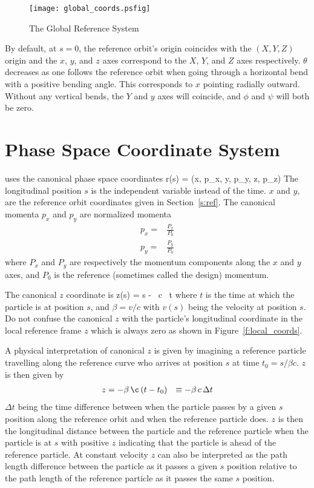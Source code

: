 \begin{figure}
\centering
\texttt{[image: global\_coords.psfig]}
\caption{The Global Reference System}
\label{f:global_coords}
\end{figure}

By default, at $s = 0$,
the reference orbit's origin coincides with the
$(X, Y, Z)$ origin and the $x$, $y$, and $z$ axes
correspond to the $X$, $Y$, and $Z$ axes respectively. $\theta$
decreases as one follows the reference orbit when going through a
horizontal bend with a positive bending angle. This corresponds to $x$
pointing radially outward. Without any vertical bends, the $Y$ and $y$
axes will coincide, and $\phi$ and $\psi$ will both be zero.

\vfill

\section{Phase Space Coordinate System}
\label{s:phase_space_coords}

\bmad uses the canonical phase space coordinates 
\Begineq
  \Bf r(s) = (x, p_x, y, p_y, z, p_z)
\Endeq
The longitudinal position $s$ is the independent variable instead of
the time.  $x$ and $y$, are the reference orbit coordinates given in
Section~\ref{s:ref}.  The canonical momenta $p_x$ and $p_y$ are
normalized momenta
\begin{align}
  p_x = &\frac{P_x}{P_0} \\
  p_y = &\frac{P_y}{P_0}
\end{align}
where $P_x$ and $P_y$ are respectively the momentum components along
the $x$ and $y$ axes, and $P_0$ is the reference (sometimes called the
design) momentum.

The canonical $z$ coordinate is 
\Begineq
  z(s) = s - \beta \, c \, t 
\Endeq
where $t$ is the time at which the particle is at
position $s$, and $\beta = v/c$ with $v(s)$ being the velocity at position $s$. 
Do not confuse the canonical $z$ with the particle's longitudinal coordinate
in the local reference frame $z$ which is always zero as shown in
Figure~\ref{f:local_coords}.

A physical interpretation of canonical $z$ is given by
imagining a reference particle travelling along the reference curve who arrives
at position $s$ at time $t_0 = s / \beta c$. $z$ is then given by
\begin{align}
  z &= -\beta \, \c \, (t - t_0)
    &\equiv - \beta \, c \, \Delta t
\end{align}
$\Delta t$ being the time difference between when the
particle passes by a given $s$ position along the reference orbit and
when the reference particle does. $z$ is then the longitudinal distance
between the particle and the reference particle when the particle is at $s$
with positive $z$ indicating that the particle is ahead of the reference 
particle. At constant velocity $z$ can also be interpreted as the 
path length difference between the
particle as it passes a given $s$ position relative to the
path length of the reference particle as it passes the same $s$
position. 

